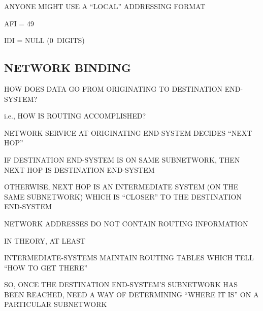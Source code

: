 \begin{bwslide}

\begin{nrtc}
\item	ANYONE MIGHT USE A ``LOCAL'' ADDRESSING FORMAT
    \begin{nrtc}
    \item	AFI = 49

    \item	IDI = NULL (0~DIGITS)
    \end{nrtc}
\end{nrtc}

\end{bwslide}


\begin{bwslide}
\part*	{NETWORK BINDING}\bf

\begin{nrtc}
\item	HOW DOES DATA GO FROM ORIGINATING TO DESTINATION END-SYSTEM?
    \begin{nrtc}
    \item	i.e., HOW IS ROUTING ACCOMPLISHED?
    \end{nrtc}

\item	NETWORK SERVICE AT ORIGINATING END-SYSTEM DECIDES ``NEXT HOP''

\item	IF DESTINATION END-SYSTEM IS ON SAME SUBNETWORK,
	THEN NEXT HOP IS DESTINATION END-SYSTEM

\item	OTHERWISE, NEXT HOP IS AN INTERMEDIATE SYSTEM (ON THE SAME SUBNETWORK)
	WHICH IS ``CLOSER'' TO THE DESTINATION END-SYSTEM
\end{nrtc}
\end{bwslide}


\begin{bwslide}

\begin{nrtc}
\item	NETWORK ADDRESSES DO NOT CONTAIN ROUTING INFORMATION
    \begin{nrtc}
    \item	IN THEORY, AT LEAST
    \end{nrtc}

\item	INTERMEDIATE-SYSTEMS MAINTAIN ROUTING TABLES WHICH TELL
	``HOW TO GET THERE''

\item	SO, ONCE THE DESTINATION END-SYSTEM'S SUBNETWORK HAS BEEN REACHED,
	NEED A WAY OF DETERMINING ``WHERE IT IS'' ON A PARTICULAR
	SUBNETWORK
\end{nrtc}
\end{bwslide}


